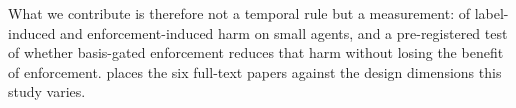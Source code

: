 What we contribute is therefore not a temporal rule but a measurement: of label-induced and enforcement-induced
harm on small agents, and a pre-registered test of whether basis-gated enforcement reduces that harm without losing
the benefit of enforcement.  places the six full-text papers against the design dimensions this
study varies.


